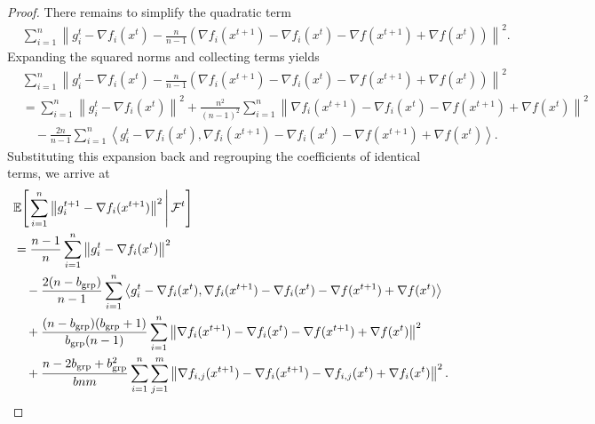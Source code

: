 \documentclass{article}
\newcommand{\sqn}[1]{\left\| #1 \right\|^2}
\newcommand{\Expb}[2]{\mathbb{E}\!\left[\left. #1\,\right|#2 \right]}
\newcommand{\Expc}[1]{\Expb{#1}{\mathcal{F}^t}}
\theoremstyle{plain}
\begin{document}
\begin{proof}
There remains to simplify the quadratic term
\begin{align*}
&\sum_{i=1}^n\left\| g_i^{t}-\nabla f_i(x^{t})- \frac{n}{n-1}\left(\nabla f_{i}(x^{t+1})-\nabla f_{i}(x^{t})-\nabla f(x^{t+1})+\nabla f(x^{t}) \right) \right\|^2.
\end{align*}
Expanding the squared norms and collecting terms yields
\begin{align*}
&\sum_{i=1}^n\left\| g_i^{t}-\nabla f_i(x^{t})- \frac{n}{n-1}\left(\nabla f_{i}(x^{t+1})-\nabla f_{i}(x^{t})-\nabla f(x^{t+1})+\nabla f(x^{t}) \right) \right\|^2\\
&=\sum_{i=1}^n\sqn{g_i^{t}-\nabla f_i(x^{t})}
+\frac{n^2}{(n-1)^2}\sum_{i=1}^n\sqn{\nabla f_{i}(x^{t+1})-\nabla f_{i}(x^{t})-\nabla f(x^{t+1})+\nabla f(x^{t})}\\
&\quad-\frac{2n}{n-1}\sum_{i=1}^n\left\langle g_i^{t}-\nabla f_i(x^{t}),
\nabla f_{i}(x^{t+1})-\nabla f_{i}(x^{t})-\nabla f(x^{t+1})+\nabla f(x^{t})\right\rangle.
\end{align*}
Substituting this expansion back and regrouping the coefficients of identical terms, we arrive at
\begin{align*}
&\Expc{\sum_{i=1}^n \sqn{g_i^{t+1}-\nabla f_i(x^{t+1})}}\\
&=\frac{n-1}{n} \sum_{i=1}^n\sqn{g_i^t - \nabla f_i(x^{t})}\\
&\quad-\frac{2(n-b_{\mathrm{grp}})}{n-1}\sum_{i=1}^n\left\langle g_i^{t}-\nabla f_i(x^{t}),
\nabla f_{i}(x^{t+1})-\nabla f_{i}(x^{t})-\nabla f(x^{t+1})+\nabla f(x^{t})\right\rangle\\
&\quad+\frac{(n-b_{\mathrm{grp}})(b_{\mathrm{grp}}+1)}{b_{\mathrm{grp}}(n-1)}\sum_{i=1}^n
\sqn{\nabla f_{i}(x^{t+1})-\nabla f_{i}(x^{t})-\nabla f(x^{t+1})+\nabla f(x^{t})}\\
&\quad+\frac{n-2b_{\mathrm{grp}}+b_{\mathrm{grp}}^2}{bnm}\sum_{i=1}^n\sum_{j=1}^m
\sqn{\nabla f_{i,j}(x^{t+1})- \nabla f_{i}(x^{t+1})-\nabla f_{i,j}(x^{t})+\nabla f_{i}(x^{t})}.\notag
\end{align*}


\end{proof}
\end{document}
